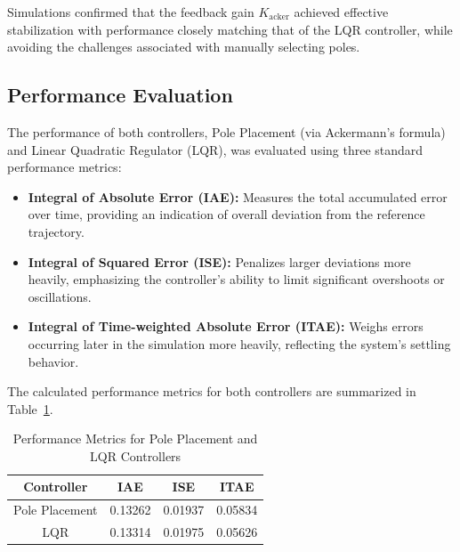 \documentclass[conference]{IEEEtran}
\begin{document}
Simulations confirmed that the feedback gain \(K_{\text{acker}}\) achieved effective stabilization with performance closely matching that of the LQR controller, while avoiding the challenges associated with manually selecting poles.



\subsection{Performance Evaluation}
\label{subsec:control_performance}
The performance of both controllers, Pole Placement (via Ackermann's formula) and Linear Quadratic Regulator (LQR), was evaluated using three standard performance metrics:

\begin{itemize}
    \item \textbf{Integral of Absolute Error (IAE):} Measures the total accumulated error over time, providing an indication of overall deviation from the reference trajectory.
    \item \textbf{Integral of Squared Error (ISE):} Penalizes larger deviations more heavily, emphasizing the controller's ability to limit significant overshoots or oscillations.
    \item \textbf{Integral of Time-weighted Absolute Error (ITAE):} Weighs errors occurring later in the simulation more heavily, reflecting the system's settling behavior.
\end{itemize}

The calculated performance metrics for both controllers are summarized in Table~\ref{tab:performance_metrics}.

\begin{table}[H]
\centering
\caption{Performance Metrics for Pole Placement and LQR Controllers}
\label{tab:performance_metrics}
\begin{tabular}{|c|c|c|c|}
\hline
\textbf{Controller} & \textbf{IAE}   & \textbf{ISE}   & \textbf{ITAE}  \\ \hline
Pole Placement      & 0.13262        & 0.01937        & 0.05834        \\ \hline
LQR                 & 0.13314        & 0.01975        & 0.05626        \\ \hline
\end{tabular}
\end{table}
\end{document}
